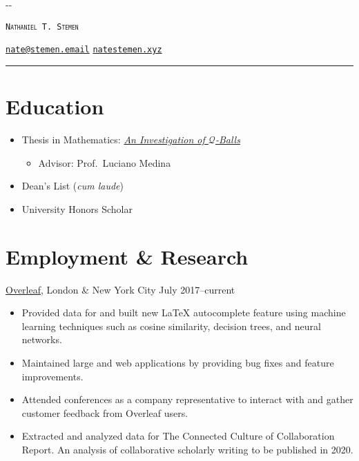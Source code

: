 \documentclass{cultvoucher}
\begin{document}
\thispagestyle{firststyle}

\begin{adjustwidth}{\dimexpr-\marginparsep-\marginparwidth}{}
	\begin{center}
		{\Huge \textsc{\texttt{Nathaniel T. Stemen}}\par}
		\href{mailto:nate@stemen.email}{\texttt{nate@stemen.email}} \textbullet{}
		\href{https://natestemen.xyz}{\texttt{natestemen.xyz}}
		\rule{\dimexpr\textwidth+\marginparsep+\marginparwidth}{0.4pt}\par
	\end{center}
\end{adjustwidth}

\section{Education}

\begin{itemize}
	\item Thesis in Mathematics: \href{https://github.com/natestemen/q-vortex-thesis}{\textit{An Investigation of \(\mathcal{Q}\)-Balls}}
	      \begin{itemize}
		      \item Advisor: Prof.\ Luciano Medina
	      \end{itemize}
	\item Dean's List (\textit{cum laude})
	\item University Honors Scholar
\end{itemize}

\section{Employment \& Research}
{\href{https://www.overleaf.com/}{Overleaf}, London \& New York City}
{July 2017--current}
\begin{itemize}
	\vspace{-0.25em}
	\item Provided data for and built new \LaTeX{} autocomplete feature using
	      machine learning techniques such as cosine similarity, decision trees,
	      and neural networks.
	\item Maintained large  and  web applications
	      by providing bug fixes and feature improvements.
	\item Attended conferences as a company representative to interact with and
	      gather customer feedback from Overleaf users.
	\item Extracted and analyzed data for The Connected Culture of Collaboration
	      Report. An analysis of collaborative scholarly writing to be published
	      in 2020.
\end{itemize}
\end{document}
